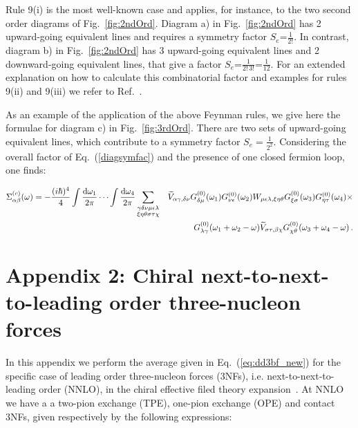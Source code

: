 Rule 9(i)  is the most well-known case and applies, for instance, to the two second order diagrams 
 of Fig.~\ref{fig:2ndOrd}. Diagram a) in Fig.~\ref{fig:2ndOrd} has 2 upward-going equivalent lines and requires a symmetry factor $S_e$=$\frac1{2!}$. In contrast, diagram b) in Fig.~\ref{fig:2ndOrd} has 3 upward-going equivalent lines and 2 downward-going equivalent lines, that give a factor $S_e$=$\frac1{2! \, 3!}$=$\frac1{12}$. For an extended explanation on how to calculate this combinatorial factor and examples for rules 9(ii) and 9(iii) we refer to Ref.~\cite{ch11_Carbone2013Nov}.
 
 As an example of the application of the above Feynman rules, we give here the formulae for diagram c) in Fig.~\ref{fig:3rdOrd}. There are two sets of upward-going equivalent lines, which contribute to a
symmetry factor $S_e=\frac{1}{2^2}$. Considering the overall factor of Eq.~(\ref{diagsymfac}) and the
presence of one closed fermion loop, one finds:

\begin{eqnarray}
\Sigma^{(c)}_{\alpha \beta}(\omega)=
- \frac{(i \hbar)^{4} }{4}
%
\int\frac{{\rm d}\omega_1}{2\pi} \cdots \int\frac{{\rm d}\omega_4}{2\pi}
\sum_{\substack{ \gamma\delta\nu \mu\epsilon\lambda \\ \xi\eta\theta \sigma\tau\chi}} 
&&
\widetilde{V}_{\alpha\gamma,\delta\nu}G^{(0)}_{\delta\mu}(\omega_1)G^{(0)}_{\nu\epsilon}(\omega_2) 
W_{\mu\epsilon\lambda,\xi\eta\theta}G^{(0)}_{\xi\sigma}(\omega_3)G^{(0)}_{\eta\tau}(\omega_4) \times 
\nonumber\\ &&
G^{(0)}_{\lambda\gamma}(\omega_1+\omega_2-\omega)
\widetilde{V}_{\sigma\tau,\beta\chi}
G^{(0)}_{\chi\theta}(\omega_3+\omega_4-\omega)  \, .
\end{eqnarray}
 


\section*{Appendix 2: Chiral next-to-next-to-leading order three-nucleon forces}
\label{app:scgf_3NF}

In this appendix we perform the average given in Eq.~(\ref{eq:dd3bf_new}) for the specific case of leading order three-nucleon forces (3NFs), i.e. next-to-next-to-leading order (NNLO), in the chiral effective filed theory expansion~\cite{ch11_vKol1994,ch11_Epelbaum2002Dec2}. At NNLO we have a a two-pion exchange (TPE), one-pion exchange (OPE) and contact 3NFs, given respectively by the following expressions:

